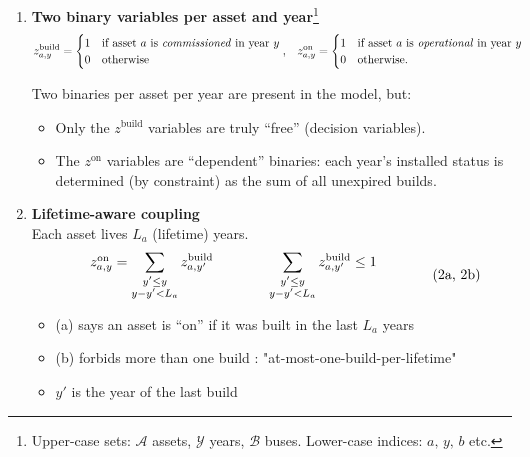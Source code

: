 \begin{enumerate}[label=\textbf{\roman*}.]
  \item \textbf{Two binary variables per asset and year}\footnote{Upper-case sets:
        $\mathcal{A}$ assets, $\mathcal{Y}$ years, $\mathcal{B}$ buses.
        Lower-case indices: $a,\,y,\,b$ etc.}
        \begin{align*}
            z^{\text{build}}_{a,y} &= 
              \begin{cases}
                1 &\text{if asset $a$ is \emph{commissioned} in year $y$}\\
                0 &\text{otherwise}
              \end{cases},
            &
            z^{\text{on}}_{a,y} &= 
              \begin{cases}
                1 &\text{if asset $a$ is \emph{operational} in year $y$}\\
                0 &\text{otherwise.}
              \end{cases}
        \end{align*}

        Two binaries per asset per year are present in the model, but:
        \begin{itemize}
            \item Only the $z^{\text{build}}$ variables are truly “free” (decision variables).
            \item The $z^{\text{on}}$ variables are “dependent” binaries: each year’s installed status is determined (by constraint) as the sum of all unexpired builds.
        \end{itemize}

  \item \textbf{Lifetime-aware coupling}\\
        Each asset lives $L_a$ (lifetime) years.
        \begin{equation}
            \setlength{\arraycolsep}{2em}
            \begin{array}{rlrl}
                z^{\text{on}}_{a,y} = \displaystyle \sum_{\substack{y' \le y \\ y - y' < L_a}} z^{\text{build}}_{a,y'} 
                & \displaystyle \sum_{\substack{y' \le y \\ y - y' < L_a}} z^{\text{build}}_{a,y'} \le 1
            \end{array}
            \tag{2a, 2b}
            \label{eq:lifetime_link}
        \end{equation}
        \addtocounter{equation}{1}  %
        \noindent
        \begin{itemize}
            \item (a) says an asset is “on” if it was built in the last $L_a$ years
            \item (b) forbids more than one build : "at-most-one-build-per-lifetime"
            \item $y'$ is the year of the last build
        \end{itemize}


\end{enumerate}
